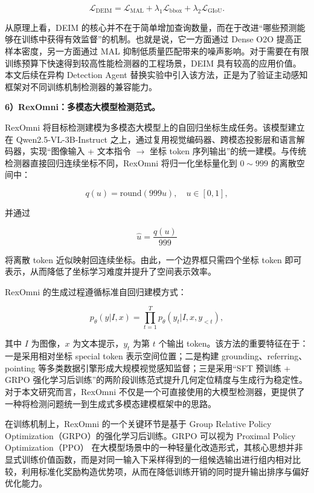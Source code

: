 \begin{equation}
\mathcal{L}_{\text{DEIM}}=\mathcal{L}_{\text{MAL}}+\lambda_{1}\mathcal{L}_{\text{bbox}}+\lambda_{2}\mathcal{L}_{\text{GIoU}}.
\end{equation}

从原理上看，DEIM 的核心并不在于简单增加查询数量，而在于改进“哪些预测能够在训练中获得有效监督”的机制。也就是说，它一方面通过 Dense O2O 提高正样本密度，另一方面通过 MAL 抑制低质量匹配带来的噪声影响。对于需要在有限训练预算下快速得到较高性能检测器的工程场景，DEIM 具有较高的应用价值。本文后续在异构 Detection Agent 替换实验中引入该方法，正是为了验证主动感知框架对不同训练机制检测器的兼容能力。

\noindent\textbf{6）RexOmni：多模态大模型检测范式。}

RexOmni 将目标检测建模为多模态大模型上的自回归坐标生成任务\cite{rexomni,wang2024qwen2}。该模型建立在 Qwen2.5-VL-3B-Instruct 之上，通过复用视觉编码器、跨模态投影层和语言解码器，实现“图像输入 + 文本指令 $\rightarrow$ 坐标 token 序列输出”的统一建模。与传统检测器直接回归连续坐标不同，RexOmni 将归一化坐标量化到 $0\sim999$ 的离散空间中：

\begin{equation}
q(u)=\mathrm{round}(999u),\quad u\in[0,1],
\end{equation}

并通过

\begin{equation}
\hat u=\frac{q(u)}{999}
\end{equation}

将离散 token 近似映射回连续坐标。由此，一个边界框只需四个坐标 token 即可表示，从而降低了坐标学习难度并提升了空间表示效率。

RexOmni 的生成过程遵循标准自回归建模方式：

\begin{equation}
p_{\theta}(y|I,x)=\prod_{t=1}^{T}p_{\theta}(y_t|I,x,y_{<t}),
\end{equation}

其中 $I$ 为图像，$x$ 为文本提示，$y_t$ 为第 $t$ 个输出 token。该方法的重要特征在于：一是采用相对坐标 special token 表示空间位置；二是构建 grounding、referring、pointing 等多类数据引擎形成大规模视觉感知监督；三是采用“SFT 预训练 + GRPO 强化学习后训练”的两阶段训练范式提升几何定位精度与生成行为稳定性。对于本文研究而言，RexOmni 不仅是一个可直接使用的大模型检测器，更提供了一种将检测问题统一到生成式多模态建模框架中的思路。

在训练机制上，RexOmni 的一个关键环节是基于 Group Relative Policy Optimization（GRPO）的强化学习后训练\cite{shao2024deepseekmath,rexomni}。GRPO 可以视为 Proximal Policy Optimization（PPO）\cite{schulman2017ppo} 在大模型场景中的一种轻量化改造形式，其核心思想并非显式训练价值函数，而是对同一输入下采样得到的一组候选输出进行组内相对比较，利用标准化奖励构造优势项，从而在降低训练开销的同时提升输出排序与偏好优化能力。

